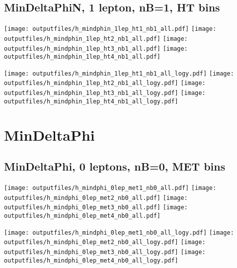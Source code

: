 \documentclass[11pt]{article}
\begin{document}
    \subsection{ MinDeltaPhiN, 1 lepton, nB=1, HT bins }

    \noindent
     \texttt{[image: outputfiles/h\_mindphin\_1lep\_ht1\_nb1\_all.pdf]}
     \texttt{[image: outputfiles/h\_mindphin\_1lep\_ht2\_nb1\_all.pdf]}
     \texttt{[image: outputfiles/h\_mindphin\_1lep\_ht3\_nb1\_all.pdf]}
     \texttt{[image: outputfiles/h\_mindphin\_1lep\_ht4\_nb1\_all.pdf]}

    \noindent
     \texttt{[image: outputfiles/h\_mindphin\_1lep\_ht1\_nb1\_all\_logy.pdf]}
     \texttt{[image: outputfiles/h\_mindphin\_1lep\_ht2\_nb1\_all\_logy.pdf]}
     \texttt{[image: outputfiles/h\_mindphin\_1lep\_ht3\_nb1\_all\_logy.pdf]}
     \texttt{[image: outputfiles/h\_mindphin\_1lep\_ht4\_nb1\_all\_logy.pdf]}

    \clearpage








    \section{ MinDeltaPhi }

    \subsection{ MinDeltaPhi, 0 leptons, nB=0, MET bins }

    \noindent
     \texttt{[image: outputfiles/h\_mindphi\_0lep\_met1\_nb0\_all.pdf]}
     \texttt{[image: outputfiles/h\_mindphi\_0lep\_met2\_nb0\_all.pdf]}
     \texttt{[image: outputfiles/h\_mindphi\_0lep\_met3\_nb0\_all.pdf]}
     \texttt{[image: outputfiles/h\_mindphi\_0lep\_met4\_nb0\_all.pdf]}

    \noindent
     \texttt{[image: outputfiles/h\_mindphi\_0lep\_met1\_nb0\_all\_logy.pdf]}
     \texttt{[image: outputfiles/h\_mindphi\_0lep\_met2\_nb0\_all\_logy.pdf]}
     \texttt{[image: outputfiles/h\_mindphi\_0lep\_met3\_nb0\_all\_logy.pdf]}
     \texttt{[image: outputfiles/h\_mindphi\_0lep\_met4\_nb0\_all\_logy.pdf]}
\end{document}
